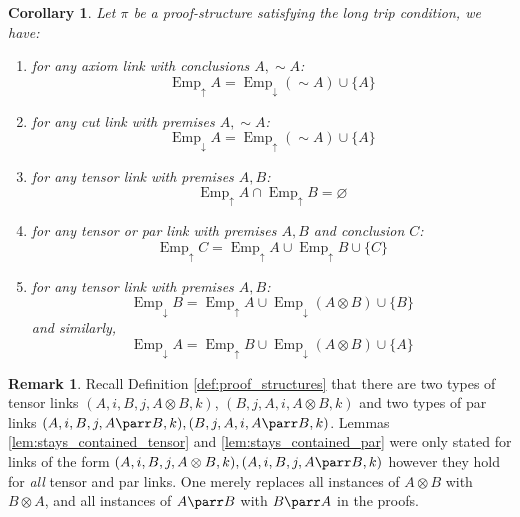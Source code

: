 \documentclass[12pt]{article}
\theoremstyle{plain}
\newtheorem{cor}[thm]{Corollary}
\theoremstyle{definition}
\newtheorem{remark}[thm]{Remark}
\newcommand{\negation}{\sim}
\begin{document}
\begin{cor}\label{cor:empire_features}
Let $\pi$ be a proof-structure satisfying the long trip condition,
we have:
\begin{enumerate}
    \item\label{cor:empire_features_up_ax} for any axiom link with conclusions $A, \negation A$:
    \begin{equation}
        \operatorname{Emp}_{\uparrow}A = \operatorname{Emp}_{\downarrow}(\negation A) \cup \lbrace A \rbrace
    \end{equation}
    \item\label{cor:empire_features_down_cut} for any cut link with premises $A, \negation A$:
    \begin{equation}
        \operatorname{Emp}_{\downarrow}A = \operatorname{Emp}_{\uparrow}(\negation A) \cup \lbrace A \rbrace
    \end{equation}
    \item\label{cor:empire_features_empty_int} for any tensor link with premises $A,B$:
    \begin{equation}
        \operatorname{Emp}_{\uparrow}A \cap \operatorname{Emp}_{\uparrow}B = \varnothing
    \end{equation}
    \item\label{cor:empire_features_up_tens_par} for any tensor or par link with premises $A,B$ and conclusion $C$:
    \begin{equation}
        \operatorname{Emp}_{\uparrow}C = \operatorname{Emp}_{\uparrow}A \cup \operatorname{Emp}_{\uparrow}B \cup \lbrace C \rbrace
    \end{equation}
    \item\label{cor:empire_features_down_tens} for any tensor link with premises $A,B$:
    \begin{equation}
        \operatorname{Emp}_{\downarrow}B = \operatorname{Emp}_{\uparrow}A \cup \operatorname{Emp}_{\downarrow}(A \otimes B) \cup \lbrace B \rbrace
    \end{equation}
    and similarly,
    \begin{equation}
        \operatorname{Emp}_{\downarrow}A = \operatorname{Emp}_{\uparrow}B \cup \operatorname{Emp}_{\downarrow}(A \otimes B) \cup \lbrace A\rbrace
    \end{equation}
\end{enumerate}
\end{cor}
\begin{remark}
Recall Definition \ref{def:proof_structures} that there are two types of tensor links $(A,i,B,j,A\otimes B,k)$,
$(B,j,A,i,A\otimes B,k)$ and two types of par links $(A,i,B,j,A\parr B, k),(B,j,A,i,A\parr B,k)$. Lemmas \ref{lem:stays_contained_tensor} and \ref{lem:stays_contained_par} were only stated for links of the form $(A,i,B,j,A\otimes B,k), (A,i,B,j,A\parr B, k)$ however they hold for \emph{all} tensor and par links. One merely replaces all instances of $A \otimes B$ with $B \otimes A$, and all instances of $A \parr B$ with $B \parr A$ in the proofs.
\end{remark}
\end{document}
